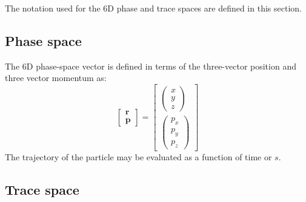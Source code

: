 The notation used for the 6D phase and trace spaces are defined in
this section.

\subsection{Phase space}

The 6D phase-space vector is defined in terms of the three-vector
position and three vector momentum as:
\begin{equation}
  \begin{bmatrix} \bm{r} \\ \bm{p} \end{bmatrix} = 
  \begin{bmatrix} \begin{pmatrix} x   \\   y \\ z   \end{pmatrix} \\
                  \begin{pmatrix} p_x \\ p_y \\ p_z \end{pmatrix} \end{bmatrix}
\end{equation}
The trajectory of the particle may be evaluated as a function of time
or $s$.

\subsection{Trace space}

